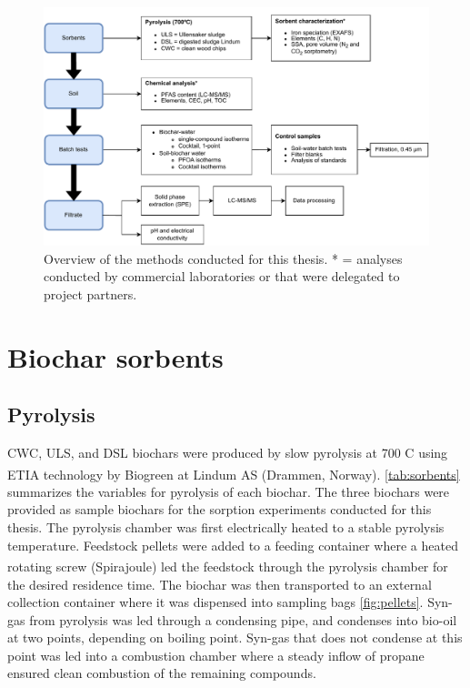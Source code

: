 \begin{figure}
    \centering
    \includegraphics[width=\textwidth]{Diagrams/Methods-General_overview_methods.pdf}
    \caption{Overview of the methods conducted for this thesis. * = analyses conducted by commercial laboratories or that were delegated to project partners.}
    \label{fig:methodoverview}
\end{figure}

\section{Biochar sorbents}
\subsection{Pyrolysis}
CWC, ULS, and DSL biochars were produced by slow pyrolysis at 700 \textdegree C using ETIA technology by Biogreen\textsuperscript{\textcopyright} at Lindum AS (Drammen, Norway). \cref{tab:sorbents} summarizes the variables for pyrolysis of each biochar. The three biochars were provided as sample biochars for the sorption experiments conducted for this thesis. The pyrolysis chamber was first electrically heated to a stable pyrolysis temperature. Feedstock pellets were added to a feeding container where a heated rotating screw (Spirajoule\textsuperscript{\textregistered}) led the feedstock through the pyrolysis chamber for the desired residence time. The biochar was then transported to an external collection container where it was dispensed into sampling bags \cref{fig:pellets}. Syn-gas from pyrolysis was led through a condensing pipe, and condenses into bio-oil at two points, depending on boiling point. Syn-gas that does not condense at this point was led into a combustion chamber where a steady inflow of propane ensured clean combustion of the remaining compounds.

